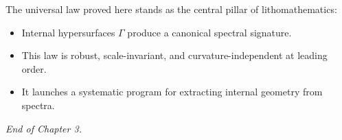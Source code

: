 The universal law proved here stands as the central pillar of lithomathematics:
\begin{itemize}
  \item Internal hypersurfaces $\Gamma$ produce a canonical spectral signature.
  \item This law is robust, scale-invariant, and curvature-independent at leading order.
  \item It launches a systematic program for extracting internal geometry from spectra.
\end{itemize}

\begin{flushright}
\emph{End of Chapter 3.}
\end{flushright}


